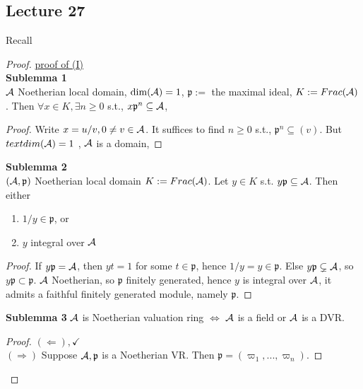 \documentclass[11pt]{article}
\newcommand{\scp}{{\mathfrak p}}
\newcommand{\cala}{{\cal A}}
\newcommand{\Lrta}{\Longrightarrow}
\newcommand{\Llta}{\Longleftarrow}
\newcommand{\Llrta}{\Longleftrightarrow}
\begin{document}
\subsection{Lecture 27}

Recall 

\begin{proof}
\underline{proof of (I)}\\
\textbf{Sublemma 1}\\
$\cala$ Noetherian local domain, $\text{dim}(\cala)=1$, $\scp:=$ the maximal ideal, $K:=Frac(\cala)$.
Then $\forall x\in K,\exists n\geq 0$ s.t., $x\scp^n\subseteq \cala$,
\begin{proof}
Write $x=u/v, 0\neq v\in \cala$. It suffices to find $n\geq 0$ s.t., $\scp^n\subseteq(v)$. But $\\text{dim}(\cala)=1$ , $\cala$ is a domain, 
\end{proof}

\textbf{Sublemma 2}\\
$(\cala,\scp)$ Noetherian local domain $K:=Frac(\cala)$. Let $y\in K$ s.t. $y\scp\subseteq \cala$. Then either
\begin{enumerate}[label=(\roman*)]
\item $1/y\in \scp$, or
\item $y$ integral over $\cala$
\end{enumerate}
\begin{proof}
If $y\scp=\cala$, then $yt=1$ for some $t\in \scp$, hence $1/y=y\in\scp$. Else $y\scp\subsetneq \cala$, so $y\scp\subset\scp$. $\cala$ Noetherian, so $\scp$ finitely generated, hence $y$ is  integral over $\cala$, it admits a faithful finitely generated  module, namely $\scp$.
\end{proof}
\textbf{Sublemma 3} $\cala$ is Noetherian valuation ring $\Llrta$ $\cala$ is a field or $\cala$ is a DVR.
\begin{proof}
$(\Llta), \checkmark$\\
$(\Lrta)$ Suppose $\cala,\scp$ is a Noetherian VR. Then $\scp=(\varpi_1,...,\varpi_n)$.


\end{proof}
\end{proof}
\end{document}

